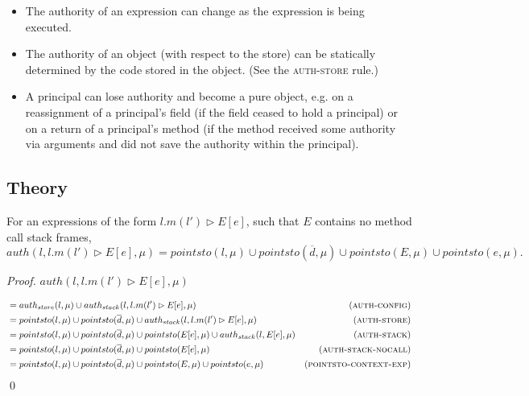 \documentclass{llncs}
\begin{document}
\begin{itemize}
\item The authority of an expression can change as the expression is being executed.

\item The authority of an object (with respect to the store) can be statically determined by the code stored in the object. (See the \textsc{auth-store} rule.)

\item A principal can lose authority and become a pure object, e.g. on a reassignment of a principal's field (if the field ceased to hold a principal) or on a return of a principal's method (if the method received some authority via arguments and did not save the authority within the principal).

\end{itemize}


\newpage

\subsection{Theory}

\begin{lemma}
For an expressions of the form $l.m(l') \rhd E[e]$, such that $E$ contains no method call stack frames,
\[
auth(l, l.m(l') \rhd E[e], \mu) = pointsto(l, \mu) \cup pointsto(\overline{d}, \mu) \cup pointsto(E, \mu) \cup pointsto(e, \mu).
\]
\end{lemma}

\begin{proof} $auth(l, l.m(l') \rhd E[e], \mu)$

\vspace{-17pt}

\begin{align*}
&= auth_{store}(l, \mu) \cup auth_{stack}(l, l.m(l') \rhd E[e], \mu) & (\textsc{auth-config})\\
&= pointsto(l, \mu) \cup pointsto(\overline{d}, \mu) \cup auth_{stack}(l, l.m(l') \rhd E[e], \mu) & (\textsc{auth-store})\\
&= pointsto(l, \mu) \cup pointsto(\overline{d}, \mu) \cup pointsto(E[e], \mu) \cup auth_{stack}(l, E[e], \mu) & (\textsc{auth-stack})\\
&= pointsto(l, \mu) \cup pointsto(\overline{d}, \mu) \cup pointsto(E[e], \mu) & (\textsc{auth-stack-nocall})\\
&= pointsto(l, \mu) \cup pointsto(\overline{d}, \mu) \cup pointsto(E, \mu) \cup pointsto(e, \mu) & (\textsc{pointsto-context-exp})
\end{align*}\qed

\end{proof}
\end{document}

